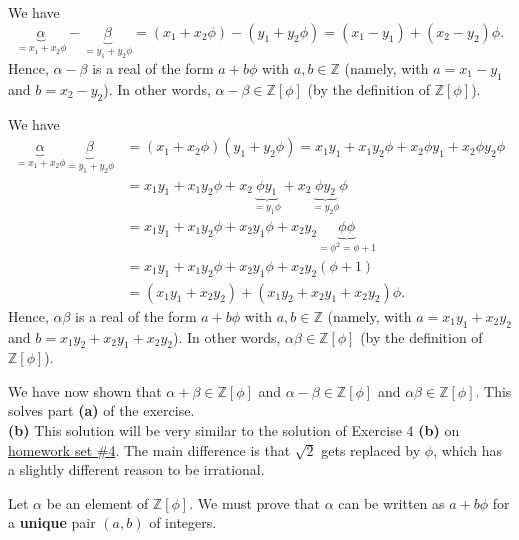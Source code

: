 \documentclass[paper=a4, fontsize=12pt]{scrartcl}%
\theoremstyle{plainsl}
\theoremstyle{definition}
\theoremstyle{remark}
\begin{document}
We have%
\[
\underbrace{\alpha}_{=x_{1}+x_{2}\phi}-\underbrace{\beta}_{=y_{1}+y_{2}\phi
}=\left(  x_{1}+x_{2}\phi\right)  -\left(  y_{1}+y_{2}\phi\right)  =\left(
x_{1}-y_{1}\right)  +\left(  x_{2}-y_{2}\right)  \phi.
\]
Hence, $\alpha-\beta$ is a real of the form $a+b\phi$ with $a,b\in\mathbb{Z}$
(namely, with $a=x_{1}-y_{1}$ and $b=x_{2}-y_{2}$). In other words,
$\alpha-\beta\in\mathbb{Z}\left[  \phi\right]  $ (by the definition of
$\mathbb{Z}\left[  \phi\right]  $).

We have%
\begin{align}
\underbrace{\alpha}_{=x_{1}+x_{2}\phi}\underbrace{\beta}_{=y_{1}+y_{2}\phi} &
=\left(  x_{1}+x_{2}\phi\right)  \left(  y_{1}+y_{2}\phi\right)  =x_{1}%
y_{1}+x_{1}y_{2}\phi+x_{2}\phi y_{1}+x_{2}\phi y_{2}\phi\nonumber\\
&  =x_{1}y_{1}+x_{1}y_{2}\phi+x_{2}\underbrace{\phi y_{1}}_{=y_{1}\phi}%
+x_{2}\underbrace{\phi y_{2}}_{=y_{2}\phi}\phi\nonumber\\
&  =x_{1}y_{1}+x_{1}y_{2}\phi+x_{2}y_{1}\phi+x_{2}y_{2}\underbrace{\phi\phi
}_{=\phi^{2}=\phi+1}\nonumber\\
&  =x_{1}y_{1}+x_{1}y_{2}\phi+x_{2}y_{1}\phi+x_{2}y_{2}\left(  \phi+1\right)
\nonumber\\
&  =\left(  x_{1}y_{1}+x_{2}y_{2}\right)  +\left(  x_{1}y_{2}+x_{2}y_{1}%
+x_{2}y_{2}\right)  \phi.\label{sol.Zphi.basics.a.ab}%
\end{align}
Hence, $\alpha\beta$ is a real of the form $a+b\phi$ with $a,b\in\mathbb{Z}$
(namely, with $a=x_{1}y_{1}+x_{2}y_{2}$ and $b=x_{1}y_{2}+x_{2}y_{1}%
+x_{2}y_{2}$). In other words, $\alpha\beta\in\mathbb{Z}\left[  \phi\right]  $
(by the definition of $\mathbb{Z}\left[  \phi\right]  $).

We have now shown that $\alpha+\beta\in\mathbb{Z}\left[  \phi\right]  $ and
$\alpha-\beta\in\mathbb{Z}\left[  \phi\right]  $ and $\alpha\beta\in
\mathbb{Z}\left[  \phi\right]  $. This solves part \textbf{(a)} of the
exercise.\\[0.4cm]

\textbf{(b)} This solution will be very similar to the solution of Exercise 4
\textbf{(b)} on
\href{http://www.cip.ifi.lmu.de/~grinberg/t/19s/hw4s.pdf}{homework set \#4}.
The main difference is that $\sqrt{2}$ gets replaced by $\phi$, which has a
slightly different reason to be irrational.

Let $\alpha$ be an element of $\mathbb{Z}\left[  \phi\right]  $. We must prove
that $\alpha$ can be written as $a+b\phi$ for a \textbf{unique} pair $\left(
a,b\right)  $ of integers.
\end{document}
